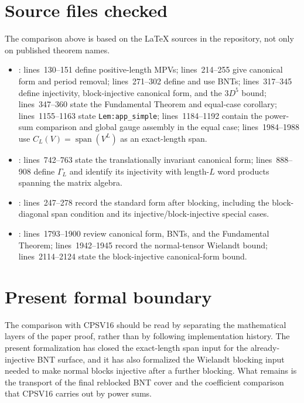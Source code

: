 \documentclass{article}
\begin{document}
\section{Source files checked}

The comparison above is based on the LaTeX sources in the repository, not only
on published theorem names.

\begin{itemize}
  \item {}: lines~130--151 define
  positive-length MPVs; lines~214--255 give canonical form and period removal;
  lines~271--302 define and use BNTs; lines~317--345 define injectivity,
  block-injective canonical form, and the $3D^5$ bound; lines~347--360 state
  the Fundamental Theorem and equal-case corollary; lines~1155--1163 state
  \texttt{Lem:app\_simple}; lines~1184--1192 contain the power-sum comparison
  and global gauge assembly in the equal case; lines~1984--1988 use
  $C_L(V)=\operatorname{span}(V^L)$ as an exact-length span.

  \item {}: lines~742--763 state the
  translationally invariant canonical form; lines~888--908 define
  $\Gamma_L$ and identify its injectivity with length-$L$ word products
  spanning the matrix algebra.

  \item {}: lines~247--278 record the
  standard form after blocking, including the block-diagonal span condition and
  its injective/block-injective special cases.

  \item {}: lines~1793--1900 review
  canonical form, BNTs, and the Fundamental Theorem; lines~1942--1945 record the
  normal-tensor Wielandt bound; lines~2114--2124 state the block-injective
  canonical-form bound.
\end{itemize}



\section{Present formal boundary}

The comparison with CPSV16 should be read by separating the mathematical layers
of the paper proof, rather than by following implementation history. The present formalization has closed the exact-length
span input for the already-injective BNT surface, and it has also formalized the
Wielandt blocking input needed to make normal blocks injective after a further
blocking. What remains is the transport of the final reblocked BNT cover and
the coefficient comparison that CPSV16 carries out by power sums.
\end{document}
